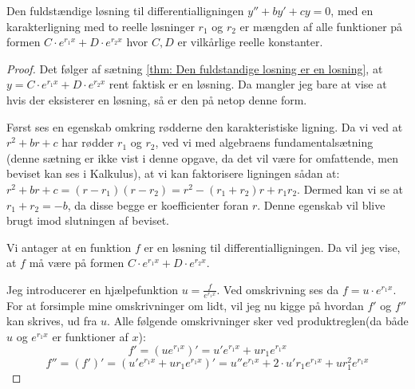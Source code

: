 \begin{thm}\label{thm: fuldstandig losning}
Den fuldstændige løsning til differentialligningen $y'' + by' + cy = 0$, med en karakterligning med to reelle løsninger $r_1$ og $r_2$ er mængden af alle funktioner på formen $C \cdot e^{r_1 x} + D \cdot e^{r_2 x}$ hvor $C,D$ er vilkårlige reelle konstanter.
\end{thm}
\begin{proof}
Det følger af sætning \ref{thm: Den fuldstandige losning er en losning}, at $y = C \cdot e^{r_1 x} + D \cdot e^{r_2 x}$ rent faktisk er en løsning. 
Da mangler jeg bare at vise at hvis der eksisterer en løsning, så er den på netop denne form.

Først ses en egenskab omkring rødderne den karakteristiske ligning. 
Da vi ved at $r^2 + br + c$ har rødder $r_1$ og $r_2$, ved vi med algebraens fundamentalsætning (denne sætning er ikke vist i denne opgave, da det vil være for omfattende, men beviset kan ses i Kalkulus), at vi kan faktorisere ligningen sådan at: $r^2 + br + c = (r-r_1)(r - r_2) = r^2 -(r_1 + r_2)r + r_1 r_2$. 
Dermed kan vi se at $r_1 + r_2 = -b$, da disse begge er koefficienter foran $r$. 
Denne egenskab vil blive brugt imod slutningen af beviset. 

Vi antager at en funktion $f$ er en løsning til differentialligningen. 
Da vil jeg vise, at $f$ må være på formen $C \cdot e^{r_1 x} + D \cdot e^{r_2 x}$. 

Jeg introducerer en hjælpefunktion $u = \frac{f}{e^{r_1 x}}$. 
Ved omskrivning ses da $f = u \cdot e^{r_1 x}$. 
For at forsimple mine omskrivninger om lidt, vil jeg nu kigge på hvordan $f'$ og $f''$ kan skrives, ud fra $u$.
Alle følgende omskrivninger sker ved produktreglen(da både $u$ og $e^{r_1 x}$ er funktioner af $x$):
$$f' = (u e^{r_1 x})' = u'e^{r_1 x} + ur_1 e^{r_1 x}$$
$$f'' = (f')' = (u'e^{r_1 x} + ur_1 e^{r_1 x})' = u''e^{r_1 x} + 2\cdot u' r_1 e^{r_1 x} + u r_1^2 e^{r_1 x}$$


\end{proof}
